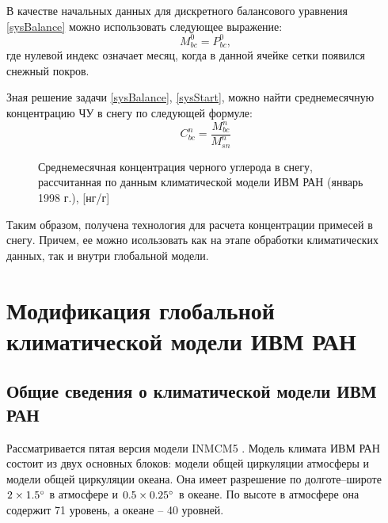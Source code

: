 \documentclass[a4paper, fontsize=14pt]{scrartcl}
\begin{document}
В качестве начальных данных для дискретного балансового уравнения \eqref{sysBalance} можно использовать следующее выражение:
\begin{equation}
    M_{bc}^0 = P_{bc}^0, \label{sysStart}
\end{equation}
где нулевой индекс означает месяц, когда в данной ячейке сетки появился снежный покров. 

Зная решение задачи \eqref{sysBalance}, \eqref{sysStart}, можно найти среднемесячную концентрацию ЧУ в снегу по следующей формуле:
\begin{equation}
   C_{bc}^n = \dfrac{M_{bc}^n}{M_{sn}^n}  \label{sys}
\end{equation}

\begin{figure}[h]
    \caption{Среднемесячная концентрация черного углерода в снегу, рассчитанная по данным климатической модели ИВМ РАН (январь 1998 г.), [нг/г]}
    \label{fig:image}
\end{figure}

Таким образом, получена технология для расчета концентрации примесей в снегу. Причем, ее можно исользовать как на этапе обработки климатических данных, так и внутри глобальной модели.

\newpage
\section{Модификация глобальной климатической модели ИВМ РАН}

\subsection{Общие сведения о климатической модели ИВМ РАН}

Рассматривается пятая версия модели INMCM5 \cite{Volodin2017}. Модель климата ИВМ РАН состоит из двух основных блоков: модели общей циркуляции атмосферы и модели общей циркуляции океана. Она имеет разрешение по долготе--широте $2 \times 1.5\degree$ в атмосфере и $0.5 \times 0.25\degree$ в океане. По высоте в атмосфере она содержит 71 уровень, а океане -- 40 уровней. 
\end{document}
